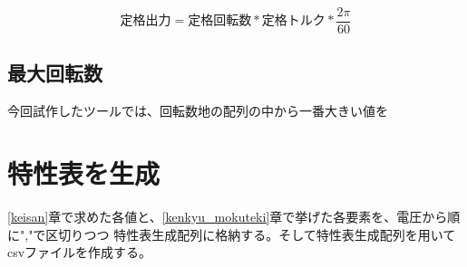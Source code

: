 \[
    \mbox{定格出力} = \mbox{定格回転数} * \mbox{定格トルク} *  \frac{2\pi}{60}
\]

\subsection{最大回転数}\label{sub:keisan_saidaikai}
今回試作したツールでは、回転数地の配列の中から一番大きい値を

\section{特性表を生成}\label{seisei_hyou}
\ref{keisan}章で求めた各値と、\ref{kenkyu_mokuteki}章で挙げた各要素を、電圧から順に","で区切りつつ
特性表生成配列に格納する。そして特性表生成配列を用いてcsvファイルを作成する。

